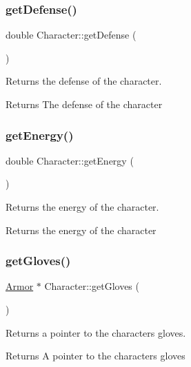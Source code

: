 \subsubsection{\texorpdfstring{getDefense()}{getDefense()}}
{\footnotesize\ttfamily double Character\+::get\+Defense (\begin{DoxyParamCaption}{ }\end{DoxyParamCaption})}



Returns the defense of the character. 

\begin{DoxyReturn}{Returns}
The defense of the character 
\end{DoxyReturn}
\mbox{\label{class_character_add3abc151041b4887ec4b1c0d7387067}} 
\subsubsection{\texorpdfstring{getEnergy()}{getEnergy()}}
{\footnotesize\ttfamily double Character\+::get\+Energy (\begin{DoxyParamCaption}{ }\end{DoxyParamCaption})}



Returns the energy of the character. 

\begin{DoxyReturn}{Returns}
the energy of the character 
\end{DoxyReturn}
\mbox{\label{class_character_ab16921d24cd1846676b6774c2de50c67}} 
\subsubsection{\texorpdfstring{getGloves()}{getGloves()}}
{\footnotesize\ttfamily \mbox{\hyperlink{class_armor}{Armor}} $\ast$ Character\+::get\+Gloves (\begin{DoxyParamCaption}{ }\end{DoxyParamCaption})}



Returns a pointer to the character\textquotesingle{}s gloves. 

\begin{DoxyReturn}{Returns}
A pointer to the character\textquotesingle{}s gloves 
\end{DoxyReturn}
\mbox{\label{class_character_a959689a61e590767de24d58c68d68eaa}} 
